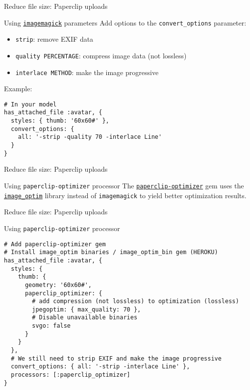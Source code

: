 \documentclass{beamer}
\begin{document}
\begin{frame}[fragile]{Reduce file size: Paperclip uploads}
\begin{block}{Using \href{http://imagemagick.org/}{\lstinline{imagemagick}} parameters}
Add options to the \lstinline{convert_options} parameter:
\begin{itemize}
  \item \lstinline{strip}: remove EXIF data
  \item \lstinline{quality PERCENTAGE}: compress image data (not lossless)
  \item \lstinline{interlace METHOD}: make the image progressive
\end{itemize}
Example:
\begin{lstlisting}
# In your model
has_attached_file :avatar, {
  styles: { thumb: '60x60#' },
  convert_options: {
    all: '-strip -quality 70 -interlace Line'
  }
}
\end{lstlisting}
\end{block}
\end{frame}

\begin{frame}[fragile]{Reduce file size: Paperclip uploads}
\begin{block}{Using \lstinline{paperclip-optimizer} processor}
The \href{https://github.com/janfoeh/paperclip-optimizer}{\lstinline{paperclip-optimizer}} gem uses the \href{https://github.com/toy/image_optim}{\lstinline{image_optim}} library
instead of \lstinline{imagemagick} to yield better optimization results.
\end{block}
\end{frame}

\begin{frame}[fragile]{Reduce file size: Paperclip uploads}

Using \lstinline{paperclip-optimizer} processor

\begin{lstlisting}
# Add paperclip-optimizer gem
# Install image_optim binaries / image_optim_bin gem (HEROKU)
has_attached_file :avatar, {
  styles: {
    thumb: {
      geometry: '60x60#',
      paperclip_optimizer: {
        # add compression (not lossless) to optimization (lossless)
        jpegoptim: { max_quality: 70 },
        # Disable unavailable binaries
        svgo: false
      }
    }
  },
  # We still need to strip EXIF and make the image progressive
  convert_options: { all: '-strip -interlace Line' },
  processors: [:paperclip_optimizer]
}
\end{lstlisting}
\end{frame}
\end{document}
